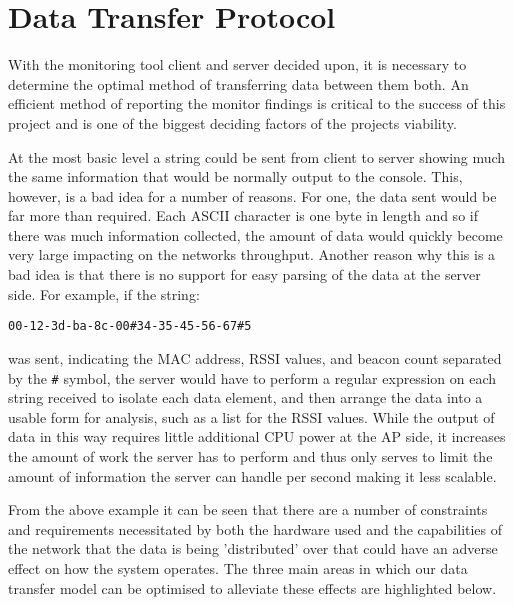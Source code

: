   \section{Data Transfer Protocol}
    \label{sec:datatx}
    With the monitoring tool client and server decided upon, it is necessary to determine the optimal method of transferring data between them both. An efficient method of reporting the monitor findings is critical to the success of this project and is one of the biggest deciding factors of the projects viability.

    At the most basic level a string could be sent from client to server showing much the same information that would be normally output to the console. This, however, is a bad idea for a number of reasons. For one, the data sent would be far more than required. Each ASCII character is one byte in length and so if there was much information collected, the amount of data would quickly become very large impacting on the networks throughput. Another reason why this is a bad idea is that there is no support for easy parsing of the data at the server side. For example, if the string:
    \begin{center}
     \texttt{00-12-3d-ba-8c-00\#34-35-45-56-67\#5}
    \end{center}
    was sent, indicating the MAC address, RSSI values, and beacon count separated by the \texttt{\#} symbol, the server would have to perform a regular expression on each string received to isolate each data element, and then arrange the data into a usable form for analysis, such as a list for the RSSI values. While the output of data in this way requires little additional CPU power at the AP side, it increases the amount of work the server has to perform and thus only serves to limit the amount of information the server can handle per second making it less scalable.

    From the above example it can be seen that there are a number of constraints and requirements necessitated by both the hardware used and the capabilities of the network that the data is being 'distributed' over that could have an adverse effect on how the system operates. The three main areas in which our data transfer model can be optimised to alleviate these effects are highlighted below.

